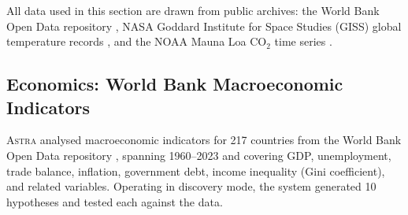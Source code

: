 \documentclass[usenatbib]{rasti}
\newcommand{\astra}{\textsc{Astra}\xspace}
\begin{document}
All data used in this section are drawn from public archives: the World Bank Open Data repository \citep{WorldBank2024}, NASA Goddard Institute for Space Studies (GISS) global temperature records \citep{Hansen2010}, and the NOAA Mauna Loa CO$_{2}$ time series \citep{NOAA2024}.

\subsection{Economics: World Bank Macroeconomic Indicators}
\label{sec:crossdomain:economics}

\astra analysed macroeconomic indicators for 217 countries from the World Bank Open Data repository \citep{WorldBank2024}, spanning 1960--2023 and covering GDP, unemployment, trade balance, inflation, government debt, income inequality (Gini coefficient), and related variables.
Operating in discovery mode, the system generated 10 hypotheses and tested each against the data.
\end{document}
